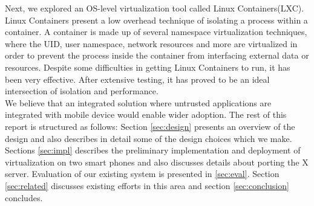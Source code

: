 Next, we explored an OS-level virtualization tool called Linux Containers(LXC). Linux Containers present a low overhead technique of isolating a process within a container.  A container is made up of several namespace virtualization techniques, where the UID, user namespace, network resources and more are virtualized in order to prevent the process inside the container from interfacing external data or resources.  Despite some difficulties in getting Linux Containers to run, it has been very effective.  After extensive testing, it has proved to be an ideal intersection of isolation and performance. \\

We believe that an integrated solution where untrusted applications are integrated with mobile device would enable wider adoption. The rest of this report is structured as follows: Section \ref{sec:design} presents an overview of the design and also describes in detail some of the design choices which we make. Sections \ref{sec:impl} describes the preliminary implementation and deployment of virtualization on two smart phones and also discusses details about porting the X server. Evaluation of our existing system is presented in \ref{sec:eval}. Section \ref{sec:related} discusses existing efforts in this area and section \ref{sec:conclusion} concludes. \\

